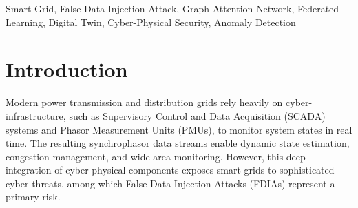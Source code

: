 \documentclass[conference]{IEEEtran}
\date{}
\begin{document}
\maketitle

\begin{abstract}
Modern smart grids are increasingly vulnerable to coordinated False Data Injection Attacks (FDIAs) that exploit cyber-physical interfaces to bypass traditional Bad Data Detection (BDD) mechanisms. This paper presents \textit{Federated GAT-Twin}, a decentralized, privacy-preserving framework combining Graph Attention Networks (GATs) and Digital Twin technology. To capture grid topological properties and isolate anomaly propagation, we decouple grid security monitoring into a dual-model framework consisting of a graph-level Detection GNN and a node-level Localization GNN. Furthermore, we construct a physics-conforming stealthy FDIA generator using grid line impedances, proving that coordinated attacks can bypass local current-voltage constraints ($I - YV = 0$) undetected by classical BDD. The proposed Federated GAT-Twin is validated on the physical MSU/ORNL 4-relay dataset and a simulated IEEE 118-bus grid. Results demonstrate that while traditional BDD remains blind to coordinated FDIAs, our framework flags grid-level intrusion with 97.62\% precision and localizes attacked buses with 99.99\% accuracy. Crucially, the dual-model inference latency averages 15.22~ms, comfortably satisfying the 112~ms grid control stability constraint.
\end{abstract}

\begin{IEEEkeywords}
Smart Grid, False Data Injection Attack, Graph Attention Network,
Federated Learning, Digital Twin, Cyber-Physical Security,
Anomaly Detection
\end{IEEEkeywords}


\section{Introduction}\label{sec:introduction}
Modern power transmission and distribution grids rely heavily on cyber-infrastructure, such as Supervisory Control and Data Acquisition (SCADA) systems and Phasor Measurement Units (PMUs), to monitor system states in real time. The resulting synchrophasor data streams enable dynamic state estimation, congestion management, and wide-area monitoring. However, this deep integration of cyber-physical components exposes smart grids to sophisticated cyber-threats, among which False Data Injection Attacks (FDIAs) represent a primary risk.
\end{document}
